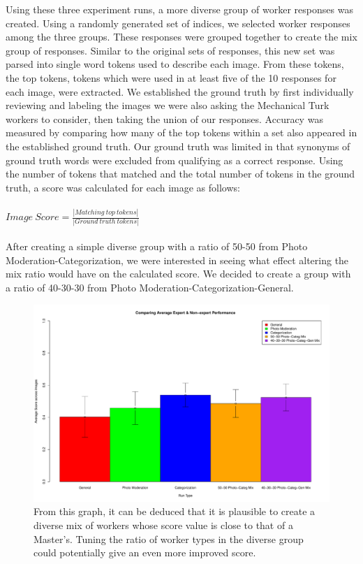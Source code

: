 \documentclass{chi2012}
\newcommand{\tab}{\hspace*{2em}}
\begin{document}
\tab Using these three experiment runs, a more diverse group of worker responses was created. Using a randomly generated set of indices, we selected worker responses among the three groups. These responses were grouped together to create the mix group of responses. Similar to the original sets of responses, this new set  was parsed into single word tokens used to describe each image. From these tokens, the top tokens, tokens which were used in at least five of the 10 responses for each image, were extracted. We established the ground truth by first individually reviewing and labeling the images we were also asking the Mechanical Turk workers to consider, then taking the union of our responses. Accuracy was measured by comparing how many of the top tokens within a set also appeared in the established ground truth. Our ground truth was limited in that synonyms of ground truth words were excluded from qualifying as a correct response. Using the number of tokens that matched and the total number of tokens in the ground truth, a score was calculated for each image as follows:
\\
\\
\begin{math}
Image \ Score=\frac{|Matching \ top \ tokens|}{|Ground \ truth \ tokens|}
\end{math}
\\
\\
\tab After creating a simple diverse group with a ratio of 50-50 from Photo Moderation-Categorization, we were interested in seeing what effect altering the mix ratio would have on the calculated score. We decided to create a group with a ratio of 40-30-30 from Photo Moderation-Categorization-General.   

 \begin{figure}
\centering
\includegraphics[width=0.9\columnwidth]{averageScores}
\caption{From this graph, it can be deduced that it is plausible to create a diverse mix of workers whose score value is close to that of a Master's. Tuning the ratio of worker types in the diverse group could potentially give an even more improved score. }
\label{fig:figure1}
\end{figure} 
\end{document}
